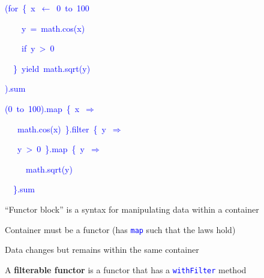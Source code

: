 \texttt{\textcolor{blue}{\footnotesize{}}}%
\begin{minipage}[t]{0.49\columnwidth}%
\begin{lyxcode}
\textcolor{blue}{\footnotesize{}(for~\{~x~$\leftarrow$~0~to~100}{\footnotesize\par}

\textcolor{blue}{\footnotesize{}~~~~y~=~math.cos(x)}{\footnotesize\par}

\textcolor{blue}{\footnotesize{}~~~~if~y~>~0}{\footnotesize\par}

\textcolor{blue}{\footnotesize{}~~\}~yield~math.sqrt(y)}{\footnotesize\par}

\textcolor{blue}{\footnotesize{}).sum}{\footnotesize\par}
\end{lyxcode}
%
\end{minipage}\texttt{\textcolor{blue}{\footnotesize{}}}%
\begin{minipage}[t]{0.49\columnwidth}%
\begin{lyxcode}
\textcolor{blue}{\footnotesize{}(0~to~100).map~\{~x~$\Rightarrow$}{\footnotesize\par}

\textcolor{blue}{\footnotesize{}~~~math.cos(x)~\}.filter~\{~y~$\Rightarrow$}{\footnotesize\par}

\textcolor{blue}{\footnotesize{}~~~y~>~0~\}.map~\{~y~$\Rightarrow$}{\footnotesize\par}

\textcolor{blue}{\footnotesize{}~~~~~math.sqrt(y)}{\footnotesize\par}

\textcolor{blue}{\footnotesize{}~~\}.sum}{\footnotesize\par}
\end{lyxcode}
%
\end{minipage}{\footnotesize\par}

``Functor block'' is a syntax for manipulating data within a container

Container must be a functor (has \texttt{\textcolor{blue}{\footnotesize{}map}}
such that the laws hold)

Data changes but remains within the same container 

A \textbf{filterable functor} is a functor that has a \texttt{\textcolor{blue}{\footnotesize{}withFilter}}
method

